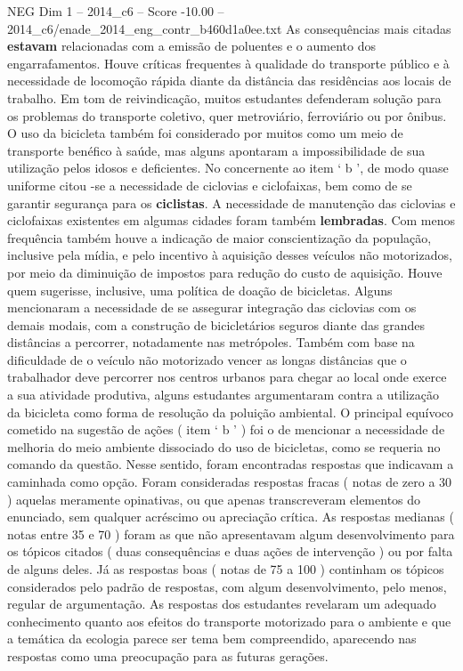 \begin{textsample}{NEG Dim 1 – 2014\_c6 – Score -10.00 – 2014\_c6/enade\_2014\_eng\_contr\_b460d1a0ee.txt}
As consequências mais citadas \textbf{estavam} relacionadas com a emissão de poluentes e o aumento dos engarrafamentos.
Houve críticas frequentes à qualidade do transporte público e à necessidade de locomoção rápida diante da distância das residências aos locais de trabalho.
Em tom de reivindicação, muitos estudantes defenderam solução para os problemas do transporte coletivo, quer metroviário, ferroviário ou por ônibus.
O uso da bicicleta também foi considerado por muitos como um meio de transporte benéfico à saúde, mas alguns apontaram a impossibilidade de sua utilização pelos idosos e deficientes.
No concernente ao item ‘ b ’, de modo quase uniforme citou -se a necessidade de ciclovias e ciclofaixas, bem como de se garantir segurança para os \textbf{ciclistas}.
A necessidade de manutenção das ciclovias e ciclofaixas existentes em algumas cidades foram também \textbf{lembradas}.
Com menos frequência também houve a indicação de maior conscientização da população, inclusive pela mídia, e pelo incentivo à aquisição desses veículos não motorizados, por meio da diminuição de impostos para redução do custo de aquisição.
Houve quem sugerisse, inclusive, uma política de doação de bicicletas.
Alguns mencionaram a necessidade de se assegurar integração das ciclovias com os demais modais, com a construção de bicicletários seguros diante das grandes distâncias a percorrer, notadamente nas metrópoles.
Também com base na dificuldade de o veículo não motorizado vencer as longas distâncias que o trabalhador deve percorrer nos centros urbanos para chegar ao local onde exerce a sua atividade produtiva, alguns estudantes argumentaram contra a utilização da bicicleta como forma de resolução da poluição ambiental.
O principal equívoco cometido na sugestão de ações ( item ‘ b ’ ) foi o de mencionar a necessidade de melhoria do meio ambiente dissociado do uso de bicicletas, como se requeria no comando da questão.
Nesse sentido, foram encontradas respostas que indicavam a caminhada como opção.
Foram consideradas respostas fracas ( notas de zero a 30 ) aquelas meramente opinativas, ou que apenas transcreveram elementos do enunciado, sem qualquer acréscimo ou apreciação crítica.
As respostas medianas ( notas entre 35 e 70 ) foram as que não apresentavam algum desenvolvimento para os tópicos citados ( duas consequências e duas ações de intervenção ) ou por falta de alguns deles.
Já as respostas boas ( notas de 75 a 100 ) continham os tópicos considerados pelo padrão de respostas, com algum desenvolvimento, pelo menos, regular de argumentação.
As respostas dos estudantes revelaram um adequado conhecimento quanto aos efeitos do transporte motorizado para o ambiente e que a temática da ecologia parece ser tema bem compreendido, aparecendo nas respostas como uma preocupação para as futuras gerações.

\end{textsample}
